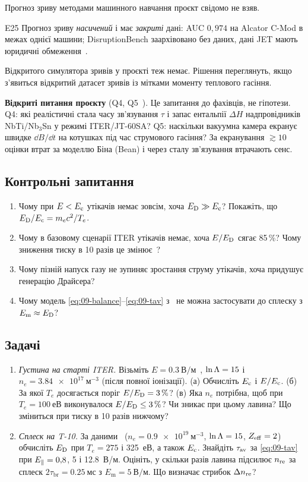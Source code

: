 Прогноз зриву методами машинного навчання проєкт свідомо не взяв.

\begin{established}{E25}
Прогноз зриву \emph{насичений} і має \emph{закриті} дані: AUC $0{,}974$ на Alcator C-Mod в межах
однієї машини; DisruptionBench заархівовано без даних, дані JET мають юридичні обмеження~\cite{ProjRegisters}.
\end{established}
\noindent Відкритого симулятора зривів у проєкті теж немає. Рішення переглянуть, якщо
з'явиться відкритий датасет зривів із мітками моменту теплового гасіння.

\textbf{Відкриті питання проєкту} (Q4, Q5~\cite{ProjRegisters}). Це запитання до фахівців, не
гіпотези. Q4: які реалістичні стала часу зв'язування $\tau$ і запас
ентальпії $\Delta H$ надпровідників NbTi/Nb$_3$Sn у режимі ITER/JT-60SA? Q5: наскільки вакуумна камера
екранує швидке $\dd B/\dd t$ на котушках під час струмового гасіння? За екранування $\gtrsim10$ оцінки втрат
за моделлю Біна (Bean) і через сталу зв'язування втрачають сенс.

\subsection*{Контрольні запитання}
\begin{enumerate}
  \item Чому при $E<E_{\mathrm{c}}$ утікачів немає зовсім, хоча $E_{\mathrm{D}}\gg E_{\mathrm{c}}$? Покажіть, що $E_{\mathrm{D}}/E_{\mathrm{c}}=m_ec^2/T_e$.
  \item Чому в базовому сценарії ITER утікачів немає, хоча $E/E_{\mathrm{D}}$ сягає 85\,\%? Чому зниження тиску
        в 10 разів це змінює~\cite{Hoppe2022}?
  \item Чому пізній напуск газу не зупиняє зростання струму утікачів, хоча придушує генерацію
        Драйсера?
  \item Чому модель \eqref{eq:09-balance}--\eqref{eq:09-tav} з~\cite{Marchuk2025} не можна застосувати до
        сплеску з $E_{\mathrm m}\approx E_{\mathrm{D}}$?
\end{enumerate}

\subsection*{Задачі}
\begin{enumerate}
  \item \emph{Густина на старті ITER.} Візьміть $E=\SI{0,3}{В/м}$~\cite{Hoppe2022}, $\ln\Lambda=15$ і
        $n_e=\SI{3,84e17}{м^{-3}}$ (після повної іонізації). (а) Обчисліть $E_{\mathrm{c}}$ і $E/E_{\mathrm{c}}$. (б) За якої $T_e$ досягається поріг
        $E/E_{\mathrm{D}}=3\,\%$? (в) Яка $n_e$ потрібна, щоб при $T_e=\SI{100}{еВ}$ виконувалося $E/E_{\mathrm{D}}\le3\,\%$?
        Чи зникає при цьому лавина? Що зміниться при тиску в 10 разів нижчому?
  \item \emph{Сплеск на T-10.} За даними~\cite{Marchuk2025} ($n_e=\SI{0,9e19}{м^{-3}}$, $\ln\Lambda=15$, $Z_{\mathrm{eff}}=2$)
        обчисліть $E_{\mathrm{D}}$ при $T_e=275$ і \SI{325}{еВ}, а також $E_{\mathrm{c}}$. Знайдіть $\tau_{\mathrm{av}}$ за \eqref{eq:09-tav}
        при $E_{\parallel}=0{,}8$, 5 і \SI{12,8}{В/м}. Оцініть, у скільки разів лавина підсилює $n_{\mathrm{re}}$ за сплеск
        $2\tau_{\mathrm{br}}=\SI{0,25}{мс}$ з $E_{\mathrm m}=\SI{5}{В/м}$. Що визначає стрибок $\Delta n_{\mathrm{re}}$?
\end{enumerate}
